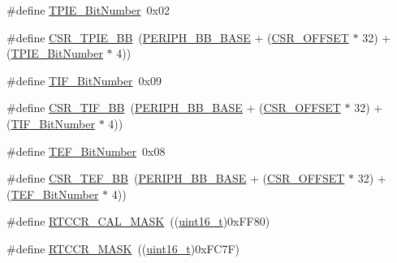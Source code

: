 \begin{DoxyCompactItemize}
\item 
\#define \hyperlink{group___b_k_p___private___defines_gac62e6ae9548498efa47fb72637545117}{T\+P\+I\+E\+\_\+\+Bit\+Number}~0x02
\item 
\#define \hyperlink{group___b_k_p___private___defines_ga1f6dcf729994613b21f554ca371d393c}{C\+S\+R\+\_\+\+T\+P\+I\+E\+\_\+\+BB}~(\hyperlink{openmotestm_2library_2inc_2stm32f10x__map_8h_aed7efc100877000845c236ccdc9e144a}{P\+E\+R\+I\+P\+H\+\_\+\+B\+B\+\_\+\+B\+A\+SE} + (\hyperlink{openmotestm_2library_2src_2stm32f10x__rcc_8c_a984cbe73312b6d3d355c5053763d499a}{C\+S\+R\+\_\+\+O\+F\+F\+S\+ET} $\ast$ 32) + (\hyperlink{openmotestm_2library_2src_2stm32f10x__bkp_8c_ac62e6ae9548498efa47fb72637545117}{T\+P\+I\+E\+\_\+\+Bit\+Number} $\ast$ 4))
\item 
\#define \hyperlink{group___b_k_p___private___defines_gac8b1b82c7029c05e720c50585762bcf2}{T\+I\+F\+\_\+\+Bit\+Number}~0x09
\item 
\#define \hyperlink{group___b_k_p___private___defines_ga8d9e7cac2321fae6d257e8c1316264e3}{C\+S\+R\+\_\+\+T\+I\+F\+\_\+\+BB}~(\hyperlink{openmotestm_2library_2inc_2stm32f10x__map_8h_aed7efc100877000845c236ccdc9e144a}{P\+E\+R\+I\+P\+H\+\_\+\+B\+B\+\_\+\+B\+A\+SE} + (\hyperlink{openmotestm_2library_2src_2stm32f10x__rcc_8c_a984cbe73312b6d3d355c5053763d499a}{C\+S\+R\+\_\+\+O\+F\+F\+S\+ET} $\ast$ 32) + (\hyperlink{openmotestm_2library_2src_2stm32f10x__bkp_8c_ac8b1b82c7029c05e720c50585762bcf2}{T\+I\+F\+\_\+\+Bit\+Number} $\ast$ 4))
\item 
\#define \hyperlink{group___b_k_p___private___defines_gaeb8676e7543d93df60cf7c63fd795672}{T\+E\+F\+\_\+\+Bit\+Number}~0x08
\item 
\#define \hyperlink{group___b_k_p___private___defines_gad60539cc791a26701d414aee529ea203}{C\+S\+R\+\_\+\+T\+E\+F\+\_\+\+BB}~(\hyperlink{openmotestm_2library_2inc_2stm32f10x__map_8h_aed7efc100877000845c236ccdc9e144a}{P\+E\+R\+I\+P\+H\+\_\+\+B\+B\+\_\+\+B\+A\+SE} + (\hyperlink{openmotestm_2library_2src_2stm32f10x__rcc_8c_a984cbe73312b6d3d355c5053763d499a}{C\+S\+R\+\_\+\+O\+F\+F\+S\+ET} $\ast$ 32) + (\hyperlink{openmotestm_2library_2src_2stm32f10x__bkp_8c_aeb8676e7543d93df60cf7c63fd795672}{T\+E\+F\+\_\+\+Bit\+Number} $\ast$ 4))
\item 
\#define \hyperlink{group___b_k_p___private___defines_ga61a540c5dd9d18e936b8fd3e01f7f6ff}{R\+T\+C\+C\+R\+\_\+\+C\+A\+L\+\_\+\+M\+A\+SK}~((\hyperlink{_p_e___types_8h_a1f1825b69244eb3ad2c7165ddc99c956}{uint16\+\_\+t})0x\+F\+F80)
\item 
\#define \hyperlink{group___b_k_p___private___defines_ga4bda91755d5ae28e9e487e946917a1ec}{R\+T\+C\+C\+R\+\_\+\+M\+A\+SK}~((\hyperlink{_p_e___types_8h_a1f1825b69244eb3ad2c7165ddc99c956}{uint16\+\_\+t})0x\+F\+C7\+F)
\end{DoxyCompactItemize}


